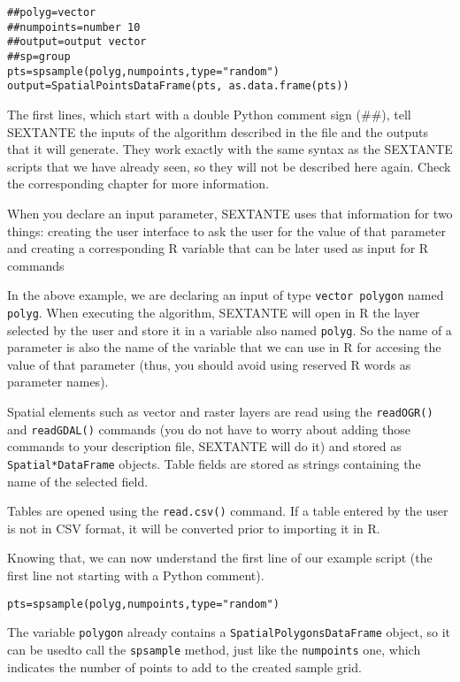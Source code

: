 \begin{verbatim}
##polyg=vector
##numpoints=number 10
##output=output vector
##sp=group
pts=spsample(polyg,numpoints,type="random")
output=SpatialPointsDataFrame(pts, as.data.frame(pts))
\end{verbatim}


The first lines, which start with a double Python comment sign (\#\#), tell SEXTANTE the inputs of the algorithm described in the file and the outputs that it will generate. They work exactly with the same syntax as the SEXTANTE scripts that we have already seen, so they will not be described here again. Check the corresponding chapter for more information.

When you declare an input parameter, SEXTANTE uses that information for two things: creating the user interface to ask the user for the value of that parameter and creating a corresponding R variable that can be later used as input for R commands

In the above example, we are declaring an input of type \texttt{vector polygon} named \texttt{polyg}. When executing the algorithm, SEXTANTE will open in R the layer selected by the user and store it in a variable also named \texttt{polyg}. So the name of a parameter is also the name of the variable that we can use in R for accesing the value of that parameter (thus, you should avoid using reserved R words as parameter names).

Spatial elements such as vector and raster layers are read using the \texttt{readOGR()} and \texttt{readGDAL()} commands (you do not have to worry about adding those commands to your description file, SEXTANTE will do it) and stored as \texttt{Spatial*DataFrame} objects. Table fields are stored as strings containing the name of the selected field.

Tables are opened using the \texttt{read.csv()} command. If a table entered by the user is not in CSV format, it will be converted prior to importing it in R.

Knowing that, we can now understand the first line of our example script (the first line not starting with a Python comment).


\begin{verbatim}
pts=spsample(polyg,numpoints,type="random")
\end{verbatim}

The variable \texttt{polygon} already contains a \texttt{SpatialPolygonsDataFrame} object, so it can be usedto call the \texttt{spsample} method, just like the \texttt{numpoints} one, which indicates the number of points to add to the created sample grid.


